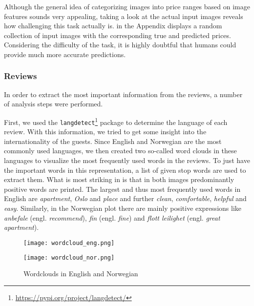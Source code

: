 Although the general idea of categorizing images into price ranges based on image features sounds very appealing, taking a look at the actual input images reveals how challenging this task actually is.
 in the Appendix displays a random collection of input images with the corresponding true and predicted prices.
Considering the difficulty of the task, it is highly doubtful that humans could provide much more accurate predictions.


\subsubsection{Reviews}

In order to extract the most important information from the reviews, a number of analysis steps were performed.

First, we used the \texttt{langdetect}\footnote{\url{https://pypi.org/project/langdetect/}} package to determine the language of each review.
With this information, we tried to get some insight into the internationality of the guests.
Since English and Norwegian are the most commonly used languages, we then created two so-called word clouds in these languages to visualize the most frequently used words in the reviews.
To just have the important words in this representation, a list of given stop words are used to extract them.
What is most striking in  is that in both images predominantly positive words are printed.
The largest and thus most frequently used words in English are \textit{apartment}, \textit{Oslo} and \textit{place} and further \textit{clean}, \textit{comfortable}, \textit{helpful} and \textit{easy}.
Similarly, in the Norwegian plot there are mainly positive expressions like \textit{anbefale} (engl. \emph{recommend}), \textit{fin} (engl. \emph{fine}) and \textit{flott leilighet} (engl. \emph{great apartment}).

\begin{figure}[t]
      \centering
      \begin{minipage}{6.7cm}
            \texttt{[image: wordcloud\_eng.png]}
      \end{minipage}
      \begin{minipage}{6.7cm}
            \texttt{[image: wordcloud\_nor.png]}
      \end{minipage}
      \caption{Wordclouds in English and Norwegian}
      \label{fig:wordclouds}
\end{figure}

